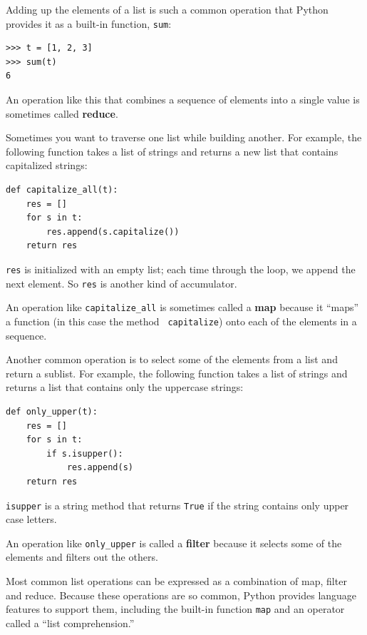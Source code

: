 \documentclass[10pt]{book}
\begin{document}

Adding up the elements of a list is such a common operation
that Python provides it as a built-in function, {\tt sum}:

\beforeverb
\begin{verbatim}
>>> t = [1, 2, 3]
>>> sum(t)
6
\end{verbatim}
\afterverb
%
An operation like this that combines a sequence of elements into
a single value is sometimes called {\bf reduce}.


Sometimes you want to traverse one list while building
another.  For example, the following function takes a list of strings
and returns a new list that contains capitalized strings:

\beforeverb
\begin{verbatim}
def capitalize_all(t):
    res = []
    for s in t:
        res.append(s.capitalize())
    return res
\end{verbatim}
\afterverb
%
{\tt res} is initialized with an empty list; each time through
the loop, we append the next element.  So {\tt res} is another
kind of accumulator.


An operation like \verb"capitalize_all" is sometimes called a {\bf
map} because it ``maps'' a function (in this case the method {\tt
capitalize}) onto each of the elements in a sequence.


Another common operation is to select some of the elements from
a list and return a sublist.  For example, the following
function takes a list of strings and returns a list that contains
only the uppercase strings:

\beforeverb
\begin{verbatim}
def only_upper(t):
    res = []
    for s in t:
        if s.isupper():
            res.append(s)
    return res
\end{verbatim}
\afterverb
%
{\tt isupper} is a string method that returns {\tt True} if
the string contains only upper case letters.

An operation like \verb"only_upper" is called a {\bf filter} because
it selects some of the elements and filters out the others.

Most common list operations can be expressed as a combination
of map, filter and reduce.  Because these operations are
so common, Python provides language features to support them,
including the built-in function {\tt map} and an operator
called a ``list comprehension.''
\end{document}
